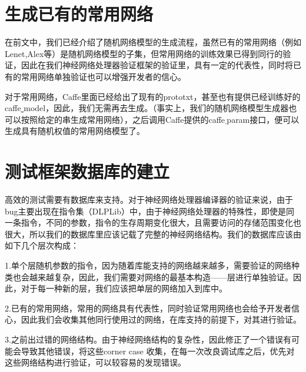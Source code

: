 \section{生成已有的常用网络}
在前文中，我们已经介绍了随机网络模型的生成流程，虽然已有的常用网络（例如Lenet,Alex等）是随机网络模型的子集，但常用网络的训练效果已得到同行的验证，因此在我们神经网络处理器验证框架的验证里，具有一定的代表性，同时将已有的常用网络单独验证也可以增强开发者的信心。

对于常用网络，Caffe里面已经给出了现有的prototxt，甚至也有提供已经训练好的caffe\underline{ }model，因此，我们无需再去生成。（事实上，我们的随机网络模型生成器也可以按照给定的串生成常用网络），之后调用Caffe提供的caffe$\underline{ }$param接口，便可以生成具有随机权值的常用网络模型了。

\section{测试框架数据库的建立}
高效的测试需要有数据库来支持。对于神经网络处理器编译器的验证来说，由于bug主要出现在指令集（DLPLib）中，由于神经网络处理器的特殊性，即使是同一条指令，不同的参数，指令的生存周期变化很大，且需要访问的存储范围变化也很大，所以我们的数据库里应该记载了完整的神经网络结构。我们的数据库应该由如下几个层次构成：

1.单个层随机参数的指令，因为随着库能支持的网络越来越多，需要验证的网络种类也会越来越复杂，因此，我们需要对网络的最基本构造——层进行单独验证。因此，对于每一种新的层，我们应该把单层的网络加入到库中。

2.已有的常用网络，常用的网络具有代表性，同时验证常用网络也会给予开发者信心，因此我们会收集其他同行使用过的网络，在库支持的前提下，对其进行验证。

3.之前出过错的网络结构。由于神经网络结构的复杂性，因此修正了一个错误有可能会导致其他错误，将这些corner case 收集，在每一次改良调试库之后，优先对这些网络结构进行验证，可以较容易的发现错误。
